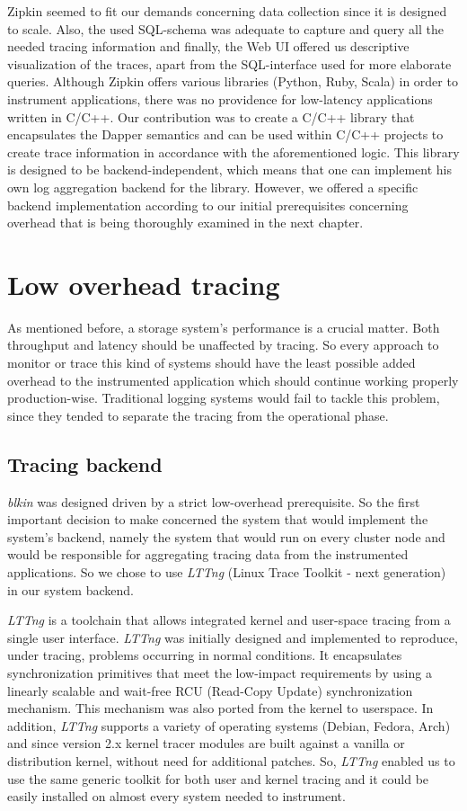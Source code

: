 \documentclass[a4paper,10pt,twocolumn]{article}
\begin{document}
Zipkin seemed to fit our demands concerning data collection since it is designed
to scale. Also, the used SQL-schema was adequate to capture and query all the
needed tracing information and finally, the Web UI offered us descriptive
visualization of the traces, apart from the SQL-interface used for more
elaborate queries. Although Zipkin offers various libraries (Python, Ruby,
Scala) in order to instrument applications, there was no providence for
low-latency applications written in C/C++. Our contribution was to create a
C/C++ library that encapsulates the Dapper semantics and can be used within
C/C++ projects to create trace information in accordance with the aforementioned
logic. This library is designed to be backend-independent, which means that one
can implement his own log aggregation backend for the library. However, we
offered a specific backend implementation according to our initial prerequisites
concerning overhead that is being thoroughly examined in the next chapter.

\section{Low overhead tracing} As mentioned before, a storage system's
performance is a crucial matter. Both throughput and latency should be
unaffected by tracing. So every approach to monitor or trace this kind of
systems should have the least possible added overhead to the instrumented
application which should continue working properly production-wise. Traditional
logging systems would fail to tackle this problem, since they tended to separate
the tracing from the operational phase.

\subsection{Tracing backend} \emph{blkin} was designed driven by a strict
low-overhead prerequisite. So the first important decision to make concerned the
system that would implement the system's backend, namely the system that would
run on every cluster node and would be responsible for aggregating tracing data
from the instrumented applications. So we chose to use \emph{LTTng} (Linux Trace
Toolkit - next generation)\cite{lttng} in our system backend.

\emph{LTTng} is a toolchain that allows integrated kernel and user-space tracing
from a single user interface. \emph{LTTng} was initially designed and
implemented to reproduce, under tracing, problems occurring in normal
conditions. It encapsulates synchronization primitives that meet the low-impact
requirements by using a linearly scalable and wait-free RCU (Read-Copy Update)
synchronization mechanism. This mechanism was also ported from the kernel to
userspace. In addition, \emph{LTTng} supports a variety of operating systems
(Debian, Fedora, Arch) and since version 2.x kernel tracer modules are built
against a vanilla or distribution kernel, without need for additional patches.
So, \emph{LTTng} enabled us to use the same generic toolkit for both user and
kernel tracing and it could be easily installed on almost every system needed to
instrument. 
\end{document}

